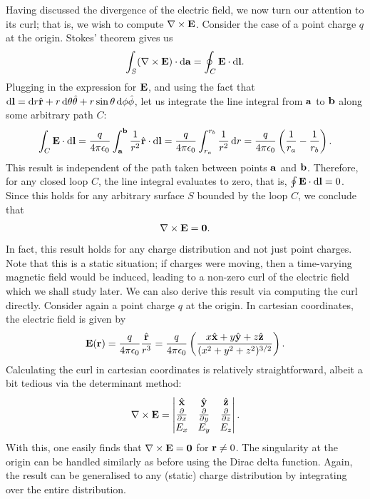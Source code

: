Having discussed the divergence of the electric field, we now turn our attention to its curl; that is, we wish to compute $\nabla \times \mathbf{E}$. Consider the case of a point charge $q$ at the origin. Stokes' theorem gives us
\begin{align}
    \int_{S} (\nabla \times \mathbf{E}) \cdot \mathrm{d}\mathbf{a} = \oint_{C} \mathbf{E} \cdot \mathrm{d}\mathbf{l}.
\end{align}
Plugging in the expression for $\mathbf{E}$, and using the fact that $\mathrm{d}\mathbf{l} = \mathrm{d}r \hat{\mathbf{r}} + r \, \mathrm{d}\theta \hat{\mathbf{\theta}} + r \sin \theta \, \mathrm{d}\phi \hat{\mathbf{\phi}}$, let us integrate the line integral from $\mathbf{a}$ to $\mathbf{b}$ along some arbitrary path $C$:
\begin{align}
    \int_{C} \mathbf{E} \cdot \mathrm{d}\mathbf{l} = \frac{q}{4 \pi \epsilon_{0}} \int_{\mathbf{a}}^{\mathbf{b}} \frac{1}{r^{2}} \hat{\mathbf{r}} \cdot \mathrm{d}\mathbf{l} = \frac{q}{4 \pi \epsilon_{0}} \int_{r_{a}}^{r_{b}} \frac{1}{r^{2}} \, \mathrm{d}r = \frac{q}{4 \pi \epsilon_{0}} \left(\frac{1}{r_{a}} - \frac{1}{r_{b}}\right).
\end{align}
This result is independent of the path taken between points $\mathbf{a}$ and $\mathbf{b}$. Therefore, for any closed loop $C$, the line integral evaluates to zero, that is, $\oint \mathbf{E} \cdot \mathrm{d}\mathbf{l} = 0$. Since this holds for any arbitrary surface $S$ bounded by the loop $C$, we conclude that
\begin{align}
    \nabla \times \mathbf{E} = \mathbf{0}.
\end{align}
In fact, this result holds for any charge distribution and not just point charges. Note that this is a static situation; if charges were moving, then a time-varying magnetic field would be induced, leading to a non-zero curl of the electric field which we shall study later. We can also derive this result via computing the curl directly. Consider again a point charge $q$ at the origin. In cartesian coordinates, the electric field is given by
\begin{align}
    \mathbf{E}(\mathbf{r}) = \frac{q}{4 \pi \epsilon_{0}} \frac{\hat{\mathbf{r}}}{r^{3}} = \frac{q}{4 \pi \epsilon_{0}} \left( \frac{x \hat{\mathbf{x}} + y \hat{\mathbf{y}} + z \hat{\mathbf{z}}}{(x^{2} + y^{2} + z^{2})^{3/2}} \right).
\end{align}
Calculating the curl in cartesian coordinates is relatively straightforward, albeit a bit tedious via the determinant method:
\begin{align}
    \nabla \times \mathbf{E} = \begin{vmatrix}
        \hat{\mathbf{x}} & \hat{\mathbf{y}} & \hat{\mathbf{z}} \\
        \frac{\partial}{\partial x} & \frac{\partial}{\partial y} & \frac{\partial}{\partial z} \\
        E_{x} & E_{y} & E_{z}
    \end{vmatrix}.
\end{align}
With this, one easily finds that $\nabla \times \mathbf{E} = \mathbf{0}$ for $\mathbf{r} \neq 0$. The singularity at the origin can be handled similarly as before using the Dirac delta function. Again, the result can be generalised to any (static) charge distribution by integrating over the entire distribution.

